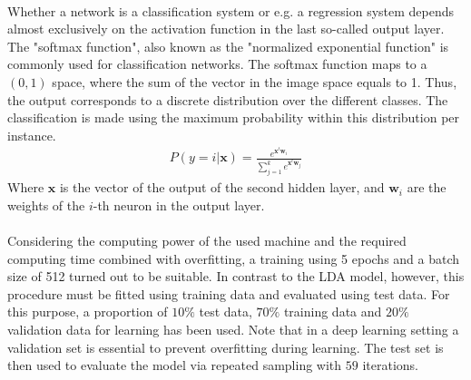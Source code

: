 \documentclass[11pt,a4paper]{article}
\begin{document}
\ \\
Whether a network is a classification system or e.g. a regression system depends almost exclusively on the activation function in the last so-called output layer. The "softmax function", also known as the "normalized exponential function" \cite[p. 115]{Bishop2006} is commonly used for  classification networks. The softmax function maps to a $(0,1)$ space, where the sum of the vector in the image space equals to 1. Thus, the output corresponds to a discrete distribution over the different classes. The classification is made using the maximum probability within this distribution per instance.
\begin{align}
	P(y=i|\textbf{x})=\frac{e^{\textbf{x}^t\textbf{w}_i}}{\sum_{j=1}^ke^{\textbf{x}^t\textbf{w}_j}}
\end{align}
Where $\textbf{x}$ is the vector of the output of the second hidden layer, and $\textbf{w}_i$ are the weights of the $i$-th neuron in the output layer.\\
\ \\
Considering the computing power of the used machine and the required computing time combined with overfitting, a training using 5 epochs and a batch size of 512 turned out to be suitable. In contrast to the LDA model, however, this procedure must be fitted using training data and evaluated using test data. For this purpose, a proportion of $10\%$ test data, $70\%$ training data and $20\%$ validation data for learning has been used. Note that in a deep learning setting a validation set is essential to prevent overfitting during learning. The test set is then used to evaluate the model via repeated sampling with $59$ iterations.\\
\end{document}
